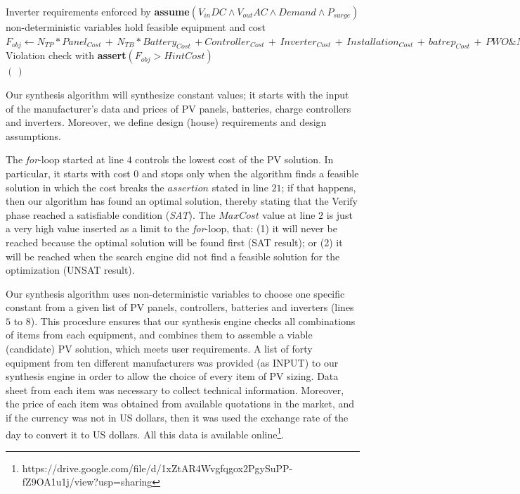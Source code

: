 \documentclass[runningheads]{llncs}
\begin{document}
\begin{algorithm}
\begin{algorithmic}[1]
	\STATE Inverter requirements enforced by \textbf{assume}$(V_{in}DC \wedge V_{out}AC \wedge Demand \wedge P_{surge})$ \\
	\STATE non-deterministic variables hold feasible equipment and cost  \\
	\STATE $F_{obj} \leftarrow  N_{TP}*Panel_{Cost} \, + \, N_{TB}*Battery_{Cost} \, + Controller_{Cost} \, + \, Inverter_{Cost} \, + \, Installation_{Cost} \, + \, batrep_{Cost} \, + \, PWO\&M_{Cost}$ \\
	\STATE Violation check with \textbf{assert}$(F_{obj} > HintCost)$ \\
  \ENDFOR
 \RETURN $(\,)$ 
 \end{algorithmic} 
 \label{alg:opt-algorithm}
 \end{algorithm}
%
Our synthesis algorithm will synthesize constant values; 
it starts with the input of the manufacturer's data and prices of PV panels, batteries, charge controllers and inverters. Moreover, we define design (house) requirements and design assumptions. 

The \textit{for}-loop started at line $4$ controls the lowest cost of the PV solution. In particular, it starts with cost $0$ and stops only when the algorithm finds a feasible solution in which the cost breaks the $assertion$ stated in line $21$; if that happens, then our algorithm has found an optimal solution, thereby stating that the {\sc Verify} phase reached a satisfiable condition (\textit{SAT}). The $MaxCost$ value at line $2$ is just a very high value inserted as a limit to the \textit{for}-loop, that: (1) it will never be reached because the optimal solution will be found first (SAT result); or (2) it will be reached when the search engine did not find a feasible solution for the optimization (UNSAT result).

Our synthesis algorithm uses non-deterministic variables to choose one specific constant from a given list of PV panels, controllers, batteries and inverters (lines $5$ to $8$). This procedure ensures that our synthesis engine checks all combinations of items from each equipment, and combines them to assemble a viable (candidate) PV solution, which meets user requirements. A list of forty equipment from ten different manufacturers was provided (as INPUT) to our synthesis engine in order to allow the choice of every item of PV sizing. Data sheet from each item was necessary to collect technical information. Moreover, the price of each item was obtained from available quotations in the market, and if the currency was not in US dollars, then it was used the exchange rate of the day to convert it to US dollars. All this data is available online\footnote{https://drive.google.com/file/d/1xZtAR4Wvgfqgox2PgySuPP-fZ9OA1u1j/view?usp=sharing}.
\end{document}
